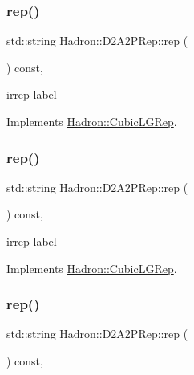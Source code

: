 \subsubsection{\texorpdfstring{rep()}{rep()}\hspace{0.1cm}{\footnotesize\ttfamily [1/3]}}
{\footnotesize\ttfamily std\+::string Hadron\+::\+D2\+A2\+P\+Rep\+::rep (\begin{DoxyParamCaption}{ }\end{DoxyParamCaption}) const\hspace{0.3cm}{\ttfamily [inline]}, {\ttfamily [virtual]}}

irrep label 

Implements \mbox{\hyperlink{structHadron_1_1CubicLGRep_a50f5ddbb8f4be4cee0106fa9e8c75e6c}{Hadron\+::\+Cubic\+L\+G\+Rep}}.

\mbox{\label{structHadron_1_1D2A2PRep_a6138d8ba45477135957914c53d06a44e}} 
\subsubsection{\texorpdfstring{rep()}{rep()}\hspace{0.1cm}{\footnotesize\ttfamily [2/3]}}
{\footnotesize\ttfamily std\+::string Hadron\+::\+D2\+A2\+P\+Rep\+::rep (\begin{DoxyParamCaption}{ }\end{DoxyParamCaption}) const\hspace{0.3cm}{\ttfamily [inline]}, {\ttfamily [virtual]}}

irrep label 

Implements \mbox{\hyperlink{structHadron_1_1CubicLGRep_a50f5ddbb8f4be4cee0106fa9e8c75e6c}{Hadron\+::\+Cubic\+L\+G\+Rep}}.

\mbox{\label{structHadron_1_1D2A2PRep_a6138d8ba45477135957914c53d06a44e}} 
\subsubsection{\texorpdfstring{rep()}{rep()}\hspace{0.1cm}{\footnotesize\ttfamily [3/3]}}
{\footnotesize\ttfamily std\+::string Hadron\+::\+D2\+A2\+P\+Rep\+::rep (\begin{DoxyParamCaption}{ }\end{DoxyParamCaption}) const\hspace{0.3cm}{\ttfamily [inline]}, {\ttfamily [virtual]}}

